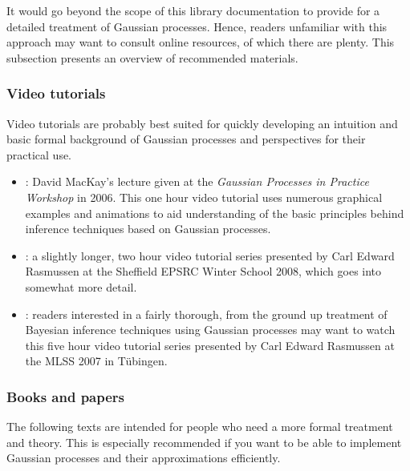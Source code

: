\documentclass[10pt]{article}
\begin{document}
It would go beyond the scope of this library documentation to provide
for a detailed treatment of Gaussian processes.  Hence, readers
unfamiliar with this approach may want to consult online resources,
of which there are plenty.  This subsection presents an overview
of recommended materials.

\subsubsection{Video tutorials}

Video tutorials are probably best suited for quickly developing an
intuition and basic formal background of Gaussian processes and
perspectives for their practical use.

\begin{itemize}

\item
\emph{}: David MacKay's lecture given at the \emph{Gaussian
Processes in Practice Workshop} in 2006.  This one hour video
tutorial uses numerous graphical examples and animations to aid
understanding of the basic principles behind inference techniques
based on Gaussian processes.

\item
\emph{}: a slightly longer, two hour video tutorial
series presented by Carl Edward Rasmussen at the Sheffield EPSRC
Winter School 2008, which goes into somewhat more detail.

\item
\emph{}: readers interested in a fairly
thorough, from the ground up treatment of Bayesian inference
techniques using Gaussian processes may want to watch this five
hour video tutorial series presented by Carl Edward Rasmussen at
the MLSS 2007 in T\"ubingen.

\end{itemize}

\subsubsection{Books and papers}

The following texts are intended for people who need a more formal
treatment and theory.  This is especially recommended if you want
to be able to implement Gaussian processes and their approximations
efficiently.
\end{document}
